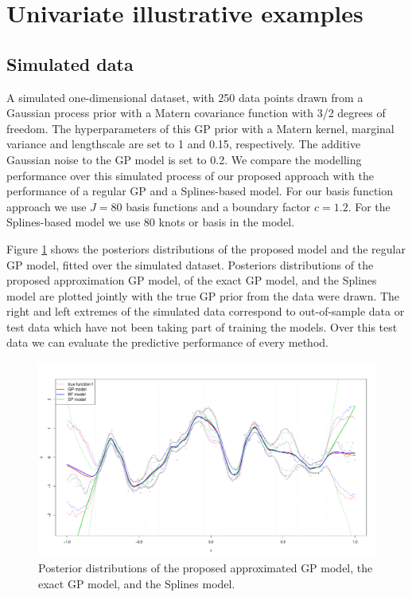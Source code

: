 \documentclass[]{interact}
\theoremstyle{plain}%
\theoremstyle{definition}
\theoremstyle{remark}
\begin{document}
\vspace{3mm}
\section{Univariate illustrative examples}\label{sec:gp_examples1D}
\subsection{Simulated data}

A simulated one-dimensional dataset, with 250 data points drawn from a Gaussian process prior with a Matern covariance function with 3/2 degrees of freedom. The hyperparameters of this GP prior with a Matern kernel, marginal variance and lengthscale are set to 1 and 0.15, respectively. The additive Gaussian noise to the GP model is set to 0.2. We compare the modelling performance over this simulated process of our proposed approach with the performance of a regular GP and a Splines-based model. For our basis function approach we use $J=80$ basis functions and a boundary factor $c=1.2$. For the Splines-based model we use 80 knots or basis in the model.

Figure \ref{fig9_Posteriors_exI} shows the posteriors distributions of the proposed model and the regular GP model, fitted over the simulated dataset. Posteriors distributions of the proposed approximation GP model, of the exact GP model, and the Splines model are plotted jointly with the true GP prior from the data were drawn. The right and left extremes of the simulated data correspond to out-of-sample data or test data which have not been taking part of training the models. Over this test data we can evaluate the predictive performance of every method.  

\begin{figure}[H]
\centering
\includegraphics[scale=0.35]{fig9_Posteriors_exI.pdf}
\caption{Posterior distributions of the proposed approximated GP model, the exact GP model, and the Splines model.}
  \label{fig9_Posteriors_exI}
\end{figure}
\end{document}
